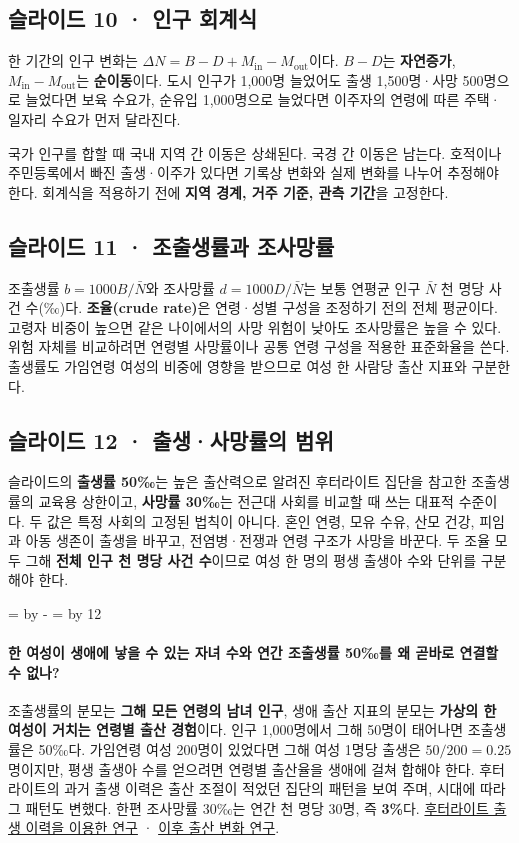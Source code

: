 \documentclass[10pt,a4paper]{article}
\newcommand{\ReserveQuestionSpace}{%
  \par\begingroup
  \dimen0=\pagegoal \advance\dimen0 by -\pagetotal
  \dimen2=\baselineskip \multiply\dimen2 by 12
  \ifdim\dimen0<\dimen2 \newpage\fi
  \endgroup}
\begin{document}
\subsection{슬라이드 10 · 인구 회계식}
한 기간의 인구 변화는 $\Delta N=B-D+M_{\mathrm{in}}-M_{\mathrm{out}}$이다. $B-D$는 \textbf{자연증가}, $M_{\mathrm{in}}-M_{\mathrm{out}}$는 \textbf{순이동}이다. 도시 인구가 1,000명 늘었어도 출생 1,500명·사망 500명으로 늘었다면 보육 수요가, 순유입 1,000명으로 늘었다면 이주자의 연령에 따른 주택·일자리 수요가 먼저 달라진다.\par

국가 인구를 합할 때 국내 지역 간 이동은 상쇄된다. 국경 간 이동은 남는다. 호적이나 주민등록에서 빠진 출생·이주가 있다면 기록상 변화와 실제 변화를 나누어 추정해야 한다. 회계식을 적용하기 전에 \textbf{지역 경계, 거주 기준, 관측 기간}을 고정한다.\par

\subsection{슬라이드 11 · 조출생률과 조사망률}
조출생률 $b=1000B/\bar N$와 조사망률 $d=1000D/\bar N$는 보통 연평균 인구 $\bar N$ 천 명당 사건 수(‰)다. \textbf{조율(crude rate)}은 연령·성별 구성을 조정하기 전의 전체 평균이다. 고령자 비중이 높으면 같은 나이에서의 사망 위험이 낮아도 조사망률은 높을 수 있다. 위험 자체를 비교하려면 연령별 사망률이나 공통 연령 구성을 적용한 표준화율을 쓴다. 출생률도 가임연령 여성의 비중에 영향을 받으므로 여성 한 사람당 출산 지표와 구분한다.\par

\subsection{슬라이드 12 · 출생·사망률의 범위}
슬라이드의 \textbf{출생률 50‰}는 높은 출산력으로 알려진 후터라이트 집단을 참고한 조출생률의 교육용 상한이고, \textbf{사망률 30‰}는 전근대 사회를 비교할 때 쓰는 대표적 수준이다. 두 값은 특정 사회의 고정된 법칙이 아니다. 혼인 연령, 모유 수유, 산모 건강, 피임과 아동 생존이 출생을 바꾸고, 전염병·전쟁과 연령 구조가 사망을 바꾼다. 두 조율 모두 그해 \textbf{전체 인구 천 명당 사건 수}이므로 여성 한 명의 평생 출생아 수와 단위를 구분해야 한다.\par

\ReserveQuestionSpace
\paragraph{한 여성이 생애에 낳을 수 있는 자녀 수와 연간 조출생률 50‰를 왜 곧바로 연결할 수 없나?}
조출생률의 분모는 \textbf{그해 모든 연령의 남녀 인구}, 생애 출산 지표의 분모는 \textbf{가상의 한 여성이 거치는 연령별 출산 경험}이다. 인구 1,000명에서 그해 50명이 태어나면 조출생률은 50‰다. 가임연령 여성 200명이 있었다면 그해 여성 1명당 출생은 $50/200=0.25$명이지만, 평생 출생아 수를 얻으려면 연령별 출산율을 생애에 걸쳐 합해야 한다. 후터라이트의 과거 출생 이력은 출산 조절이 적었던 집단의 패턴을 보여 주며, 시대에 따라 그 패턴도 변했다. 한편 조사망률 30‰는 연간 천 명당 30명, 즉 \textbf{3\%}다. \href{https://pubmed.ncbi.nlm.nih.gov/11521455/}{후터라이트 출생 이력을 이용한 연구} · \href{https://pubmed.ncbi.nlm.nih.gov/14652910/}{이후 출산 변화 연구}.\par
\end{document}
